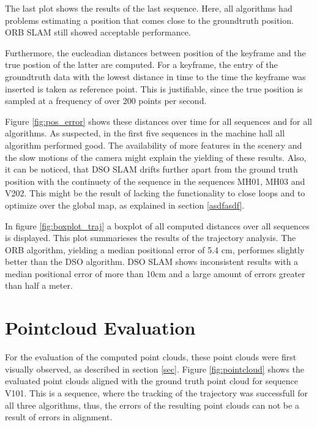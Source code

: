 	The last plot shows the results of the last sequence. Here, all algorithms had problems estimating a position that comes close to the groundtruth position. ORB
	SLAM still showed acceptable performance. 
	
	
	Furthermore, the eucleadian distances between position of the keyframe and the true postion of the latter are computed. For a keyframe, 
	the entry of the groundtruth data with the lowest distance in time to the time the keyframe was inserted is taken as reference point. 
	This is justifiable, since the true position is sampled at a frequency of over 200 points per second. 
	
	Figure \ref{fig:pos_error} shows these distances over time for all sequences and for all algorithms. As suspected, in the first five sequences in the machine 
	hall all algorithm performed good. The availability of more features in the scenery and the slow motions of the camera might explain the yielding of these results. 
	Also, it can be noticed, that DSO SLAM drifts further apart from the ground truth position with the continuety of the sequence in the sequences MH01, MH03 and V202. 
	This might be the result of lacking the functionality to close loops and to optimize over the global map, as explained in section \ref{asdfasdf}. 
	
	In figure \ref{fig:boxplot_traj} a boxplot of all computed distances over all sequences is displayed. This plot summarieses the results of the 
	trajectory analysis. The ORB algorithm, yielding a median positional error of 5.4 cm, performes slightly better than the DSO algorithm. DSO SLAM 
	shows inconsistent results with a median positional error of more than 10cm and a large amount of errors greater than half a meter. 
	
	
	
\section{Pointcloud Evaluation}

For the evaluation of the computed point clouds, these point clouds were first visually observed, as described in section \ref{sec}. 
Figure \ref{fig:pointcloud} shows the evaluated point clouds aligned with the ground truth point cloud for sequence V101. This is a sequence, 
where the tracking of the trajectory was successfull for all three algorithms, thus, the errors of the resulting point clouds can not 
be a result of errors in alignment. 

